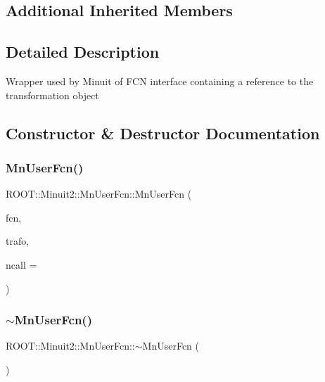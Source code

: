 \subsection*{Additional Inherited Members}


\subsection{Detailed Description}
Wrapper used by Minuit of F\+CN interface containing a reference to the transformation object 

\subsection{Constructor \& Destructor Documentation}
\mbox{\label{classROOT_1_1Minuit2_1_1MnUserFcn_aec0ec51bd2b1e3b88f686f802f2c277f}} 
\subsubsection{\texorpdfstring{MnUserFcn()}{MnUserFcn()}\hspace{0.1cm}{\footnotesize\ttfamily [1/3]}}
{\footnotesize\ttfamily R\+O\+O\+T\+::\+Minuit2\+::\+Mn\+User\+Fcn\+::\+Mn\+User\+Fcn (\begin{DoxyParamCaption}\item[{const \mbox{\hyperlink{classROOT_1_1Minuit2_1_1FCNBase}{F\+C\+N\+Base}} \&}]{fcn,  }\item[{const \mbox{\hyperlink{classROOT_1_1Minuit2_1_1MnUserTransformation}{Mn\+User\+Transformation}} \&}]{trafo,  }\item[{int}]{ncall = {} }\end{DoxyParamCaption})\hspace{0.3cm}{\ttfamily [inline]}}

\mbox{\label{classROOT_1_1Minuit2_1_1MnUserFcn_afa175648109f4cec5ab7dd274d0b0e75}} 
\subsubsection{\texorpdfstring{$\sim$MnUserFcn()}{~MnUserFcn()}\hspace{0.1cm}{\footnotesize\ttfamily [1/3]}}
{\footnotesize\ttfamily R\+O\+O\+T\+::\+Minuit2\+::\+Mn\+User\+Fcn\+::$\sim$\+Mn\+User\+Fcn (\begin{DoxyParamCaption}{ }\end{DoxyParamCaption})\hspace{0.3cm}{\ttfamily [inline]}}

